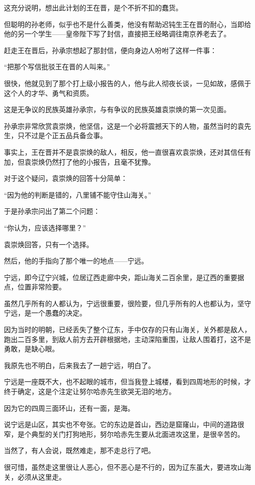 \begin{multicols}{\theparacolNo}
		这充分说明，想出此计划的王在晋，是个不折不扣的蠢货。

		但聪明的孙老师，似乎也不是什么善类，他没有帮助迟钝生王在晋的耐心，当即给他的另一个学生——皇帝陛下写了封信，直接把王经略调往南京养老去了。

		赶走王在晋后，孙承宗想起了那封信，便向身边人吩咐了这样一件事：

		“把那个写信批驳王在晋的人叫来。”

		很快，他就见到了那个打上级小报告的人，他与此人彻夜长谈，一见如故，感佩于这个人的才华、勇气和资质。

		这是无争议的民族英雄孙承宗，与有争议的民族英雄袁崇焕的第一次见面。

		孙承宗非常欣赏袁崇焕，他坚信，这是一个必将震撼天下的人物，虽然当时的袁先生，只不过是个正五品兵备佥事。

		事实上，王在晋并不是袁崇焕的敌人，相反，他一直很喜欢袁崇焕，还对其信任有加，但袁崇焕仍然打了他的小报告，且毫不犹豫。

		对于这个疑问，袁崇焕的回答十分简单：

		“因为他的判断是错的，八里铺不能守住山海关。”

		于是孙承宗问出了第二个问题：

		“你认为，应该选择哪里？”

		袁崇焕回答，只有一个选择。

		然后，他的手指向了那个唯一的地点——宁远。

		宁远，即今辽宁兴城，位居辽西走廊中央，距山海关二百余里，是辽西的重要据点，位置非常险要。

		虽然几乎所有的人都认为，宁远很重要，很险要，但几乎所有的人也都认为，坚守宁远，是一个愚蠢的决定。

		因为当时的明朝，已经丢失了整个辽东，手中仅存的只有山海关，关外都是敌人，跑出二百多里，到敌人前方去开辟根据地，主动深陷重围，让敌人围着打，这不是勇敢，是缺心眼。

		我原先也不明白，后来我去了一趟宁远，明白了。

		宁远是一座既不大，也不起眼的城市，但当我登上城楼，看到四周地形的时候，才终于确定，这是个注定让努尔哈赤先生欲哭无泪的地方。

		因为它的四周三面环山，还有一面，是海。

		说宁远是山区，其实也不夸张。它的东边是首山，西边是窟窿山，中间的道路很窄，是个典型的关门打狗地形，努尔哈赤先生要从北面进攻这里，是很辛苦的。

		当然了，有人会说，既然难走，那不走总行了吧。

		很可惜，虽然走这里很让人恶心，但不恶心是不行的，因为辽东虽大，要进攻山海关，必须从这里走。


\end{multicols}
